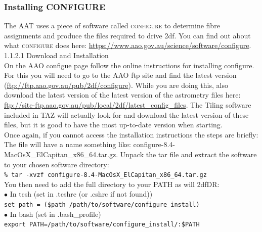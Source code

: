 \documentclass[12pt]{article}
\begin{document}
\subsubsection{Installing CONFIGURE}

The AAT uses a piece of software called \textsc{configure} to determine fibre assignments and produce the files required to drive 2df. You can find out about what \textsc{configure} does here: \url{https://www.aao.gov.au/science/software/configure}.\\ 

\textsf{1.1.2.1 Download and Installation} \\

On the AAO configue page follow the online instructions for installing configure. For this you will need to go to the AAO ftp site and find the latest version (\url{ftp://ftp.aao.gov.au/pub/2df/configure}). While you are doing this, also download the latest version of the latest version of the astrometry files here: \url{ftp://site-ftp.aao.gov.au/pub/local/2df/latest_config_files}. The Tiling software included in TAZ will actually look-for and download the latest version of these files, but it is good to have the most up-to-date version when starting.  \\



Once again, if you cannot access the installation instructions the steps are briefly: \\

The file will have a name something like: configure-8.4-MacOsX\_ElCapitan\_x86\_64.tar.gz. Unpack the tar file and extract the software to your chosen software directory:\\

\hspace{10mm} \texttt{\% tar -xvzf configure-8.4-MacOsX\_ElCapitan\_x86\_64.tar.gz}\\

You then need to add the full directory to your PATH as will 2dfDR: \\


    $\bullet$ In tcsh (set in .tcshrc (or .cshrc if not found)) \\
   \hspace{10mm} \texttt{set path = (\$path /path/to/software/configure\_install)}\\

     $\bullet$ In bash (set in .bash\_profile) \\
    \hspace{10mm} \texttt{export PATH=/path/to/software/configure\_install/:\$PATH}\\
\end{document}
